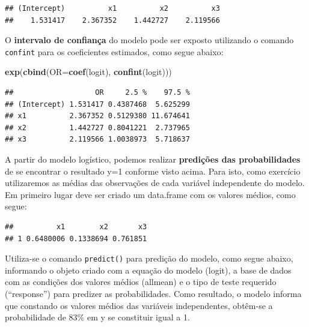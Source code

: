 \documentclass[12pt,brazil,]{book}
\newenvironment{Shaded}{\begin{snugshade}}{\end{snugshade}}
\newcommand{\DataTypeTok}[1]{\textcolor[rgb]{0.13,0.29,0.53}{#1}}
\newcommand{\KeywordTok}[1]{\textcolor[rgb]{0.13,0.29,0.53}{\textbf{#1}}}
\newcommand{\NormalTok}[1]{#1}
\newcommand{\OperatorTok}[1]{\textcolor[rgb]{0.81,0.36,0.00}{\textbf{#1}}}
\newcommand{\StringTok}[1]{\textcolor[rgb]{0.31,0.60,0.02}{#1}}
\begin{document}
\begin{verbatim}
## (Intercept)          x1          x2          x3 
##    1.531417    2.367352    1.442727    2.119566
\end{verbatim}

O \textbf{intervalo de confiança} do modelo pode ser exposto utilizando
o comando \texttt{confint} para os coeficientes estimados, como segue
abaixo:

\begin{Shaded}
\begin{Highlighting}[]
\KeywordTok{exp}\NormalTok{(}\KeywordTok{cbind}\NormalTok{(}\DataTypeTok{OR=}\KeywordTok{coef}\NormalTok{(logit), }\KeywordTok{confint}\NormalTok{(logit)))}
\end{Highlighting}
\end{Shaded}

\begin{verbatim}
##                   OR     2.5 %    97.5 %
## (Intercept) 1.531417 0.4387468  5.625299
## x1          2.367352 0.5129380 11.674641
## x2          1.442727 0.8041221  2.737965
## x3          2.119566 1.0038973  5.718637
\end{verbatim}

A partir do modelo logístico, podemos realizar \textbf{predições das
probabilidades} de se encontrar o resultado y=1 conforme visto acima.
Para isto, como exercício utilizaremos as médias das observações de cada
variável independente do modelo. Em primeiro lugar deve ser criado um
data.frame com os valores médios, como segue:

\begin{Shaded}
\end{Shaded}

\begin{verbatim}
##          x1        x2       x3
## 1 0.6480006 0.1338694 0.761851
\end{verbatim}

Utiliza-se o comando \texttt{predict()} para predição do modelo, como
segue abaixo, informando o objeto criado com a equação do modelo
(logit), a base de dados com as condições dos valores médios (allmean) e
o tipo de teste requerido (``response'') para predizer as
probabilidades. Como resultado, o modelo informa que constando os
valores médios das variáveis independentes, obtêm-se a probabilidade de
83\% em y se constituir igual a 1.
\end{document}
